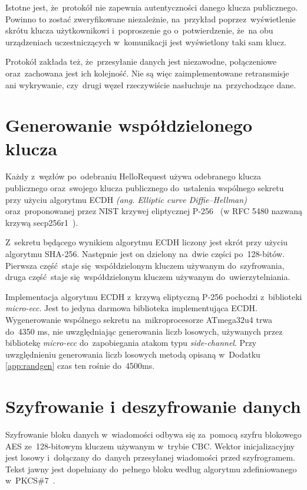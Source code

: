 Istotne jest, że~protokół nie zapewnia autentyczności danego klucza publicznego. Powinno to zostać zweryfikowane niezależnie, na~przykład poprzez~wyświetlenie skrótu klucza użytkownikowi i~poproszenie go o~potwierdzenie, że~na obu urządzeniach uczestniczących w~komunikacji jest wyświetlony taki sam klucz.

Protokół zakłada też, że~przesyłanie danych jest niezawodne, połączeniowe oraz~zachowana jest ich kolejność. Nie są więc zaimplementowane retransmisje ani wykrywanie, czy~drugi węzeł rzeczywiście nasłuchuje na~przychodzące dane.

\section{Generowanie współdzielonego klucza}
\label{sec:sharedkey}

Każdy z~węzłów po~odebraniu HelloRequest używa odebranego klucza publicznego oraz~swojego klucza publicznego do~ustalenia wspólnego sekretu przy użyciu algorytmu ECDH \emph{(ang. Elliptic curve Diffie--Hellman)} oraz~proponowanej przez NIST krzywej eliptycznej P-256~\cite{kerry2013digital} (w RFC 5480 nazwaną krzywą secp256r1~\cite{turner2009elliptic}).

Z~sekretu będącego wynikiem algorytmu ECDH liczony jest skrót przy użyciu algorytmu SHA-256. Następnie jest on dzielony na~dwie części po~128-bitów. Pierwsza część staje się współdzielonym kluczem używanym do~szyfrowania, druga część staje się współdzielonym kluczem używanym do~uwierzytelniania.

Implementacja algorytmu ECDH z~krzywą eliptyczną P-256 pochodzi z~biblioteki \emph{micro-ecc}. Jest to jedyna darmowa biblioteka implementująca ECDH. Wygenerowanie wspólnego sekretu na~mikroprocesorze ATmega32u4 trwa do~4350 ms, nie uwzględniając generowania liczb losowych, używanych przez bibliotekę \emph{micro-ecc} do~zapobiegania atakom typu \emph{side-channel}. Przy uwzględnieniu generowania liczb losowych metodą opisaną w~Dodatku \ref{app:randgen} czas ten rośnie do~4500ms.

\section{Szyfrowanie i deszyfrowanie danych}
\label{sec:encrypt}

Szyfrowanie bloku danych w~wiadomości odbywa się za~pomocą szyfru blokowego AES ze~128-bitowym kluczem używanym w~trybie CBC. Wektor inicjalizacyjny jest losowy i~dołączany do~danych przesyłanej wiadomości przed szyfrogramem. Tekst jawny jest dopełniany do~pełnego bloku według algorytmu zdefiniowanego w~PKCS\#7~\cite{kaliski1998pkcs}.

